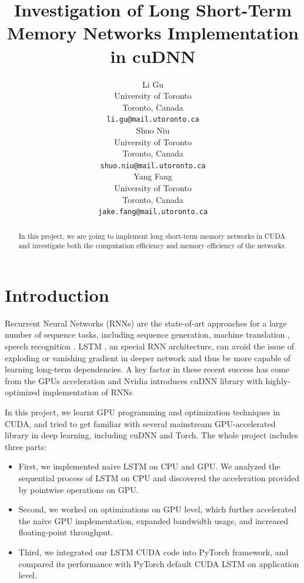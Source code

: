 \documentclass{article}
\title{Investigation of Long Short-Term Memory Networks Implementation in cuDNN}
\author{
  Li Gu \\
  University of Toronto \\
  Toronto, Canada \\
  \texttt{li.gu@mail.utoronto.ca} \\
  \And
  Shuo Niu \\
  University of Toronto \\
  Toronto, Canada \\
  \texttt{shuo.niu@mail.utoronto.ca} \\
  \And
  Yang Fang \\
  University of Toronto \\
  Toronto, Canada \\
  \texttt{jake.fang@mail.utoronto.ca} \\
}
\begin{document}

\maketitle
\begin{abstract}
  In this project, we are going to implement long short-term memory networks in CUDA 
  and investigate both the computation efficiency and memory efficiency of the networks.
\end{abstract}

\section{Introduction}


Recurrent Neural Networks (RNNs) are the state-of-art approaches for a large number of sequence tasks, including sequence generation\cite{eck2002first,sutskever2014sequence,gravessupervised}, machine translation \cite{cho2014learning,jean2015montreal,luong2015effective}, speech recognition \cite{graves2013speech}. LSTM \cite{hochreiter1997long}, an special RNN architecture, can avoid the issue of exploding or vanishing gradient \cite{pascanu2013difficulty} in deeper network and thus be more capable of learning long-term dependencies. A key factor in these recent success has come from the GPUs acceleration \cite{leonard2015rnn,weninger2015introducing} and Nvidia introduces cuDNN library\cite{chetlur2014cudnn} with highly-optimized implementation of RNNs\cite{appleyard2016optimizing} 

In this project, we learnt GPU programming and optimization techniques in CUDA, and tried to get familiar with several mainstream GPU-accelerated library in deep learning, including cuDNN and Torch. The whole project includes three parts:


\begin{itemize}
  \item First, we implemented naive LSTM on CPU and GPU. We analyzed the sequential process of LSTM on CPU and discovered the acceleration provided by pointwise operations on GPU.
  \item Second, we worked on optimizations on GPU level, which further accelerated the naive GPU implementation, expanded bandwidth usage, and increased floating-point throughput. 
  \item Third, we integrated our LSTM CUDA code into PyTorch framework, and compared its performance with PyTorch default CUDA LSTM on application level.
\end{itemize}
\end{document}
